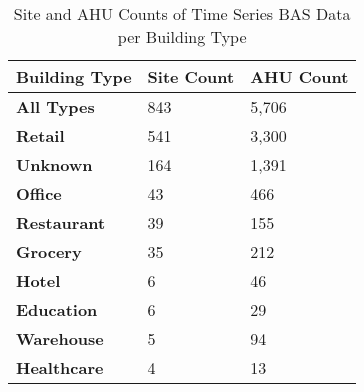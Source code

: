 \begin{table}[h!]
\centering
\small
\caption{Site and AHU Counts of Time Series BAS Data per Building Type}
\label{tab:unnoc_ahu_data_counts}
\begin{tabular}{|l|l|l|}
\hline
\textbf{Building Type} & \textbf{Site   Count} & \textbf{AHU   Count} \\ \hline
\textbf{All Types}     & 843                   & 5,706                \\ \hline
\textbf{Retail}        & 541                   & 3,300                \\ \hline
\textbf{Unknown}       & 164                   & 1,391                \\ \hline
\textbf{Office}        & 43                    & 466                  \\ \hline
\textbf{Restaurant}    & 39                    & 155                  \\ \hline
\textbf{Grocery}       & 35                    & 212                  \\ \hline
\textbf{Hotel}         & 6                     & 46                   \\ \hline
\textbf{Education}     & 6                     & 29                   \\ \hline
\textbf{Warehouse}     & 5                     & 94                   \\ \hline
\textbf{Healthcare}    & 4                     & 13                   \\ \hline
\end{tabular}
\end{table}